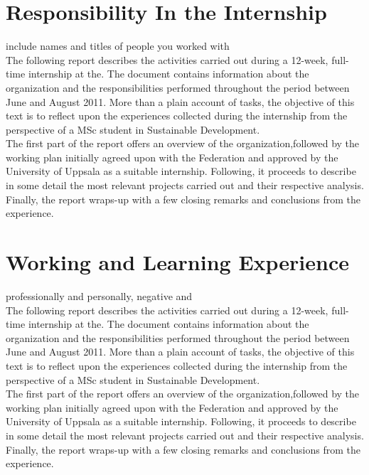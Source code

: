\documentclass[12pt,onecolumn,a4paper]{IEEEtran}
\begin{document}
\newpage
\section{\textbf{Responsibility In the Internship}}
include names and titles of people you worked with\\

The following report describes the activities carried out during a 12-week, full-time internship at the. The document contains information about the organization and the responsibilities performed throughout the period between June and August 2011. More than a plain account of tasks, the objective of this text is to reflect upon the experiences collected during the internship from the perspective of a MSc student in
Sustainable Development.\\

The first part of the report offers an overview of the organization,followed by the working plan initially agreed upon with the Federation and approved by the University of Uppsala as a suitable internship. Following, it proceeds to describe in some detail the most relevant projects carried out and their respective analysis. Finally, the report
wraps-up with a few closing remarks and conclusions from the experience.

\newpage
\section{\textbf{Working and Learning Experience}}
professionally and personally, negative and\\

The following report describes the activities carried out during a 12-week, full-time internship at the. The document contains information about the organization and the responsibilities performed throughout the period between June and August 2011. More than a plain account of tasks, the objective of this text is to reflect upon the experiences collected during the internship from the perspective of a MSc student in
Sustainable Development.\\

The first part of the report offers an overview of the organization,followed by the working plan initially agreed upon with the Federation and approved by the University of Uppsala as a suitable internship. Following, it proceeds to describe in some detail the most relevant projects carried out and their respective analysis. Finally, the report
wraps-up with a few closing remarks and conclusions from the experience.
\end{document}
